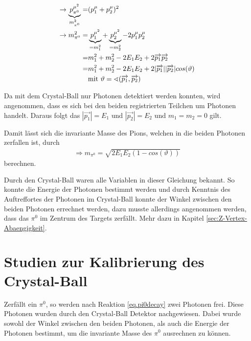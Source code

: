 \documentclass[a4paper,11pt,oneside,final,german,openbib,pdftex]{scrbook}
\begin{document}
{\begin{equation}
\begin{split}
\rightarrow \underbrace{p^{\mu^2}_{\pi^0}}_{m_{\pi^0}^2}=& (p_{1}^{\mu}+p_{2}^{\mu})^2 \\ 
\rightarrow m_{\pi^0}^2=& \underbrace{p_{1}^{\mu^2}}_{=m_1^2}+\underbrace{p_{2}^{\mu^2}}_{=m_2^2}-2p_{1}^{\mu}p_{2}^{\mu} \\ 
=& m_1^2+m_2^2-2E_1E_2+2\overrightarrow{p_1}\overrightarrow{p_2} \\ 
=& m_1^2+m_2^2-2E_1E_2+2|\overrightarrow{p_1}| |\overrightarrow{p_2}| cos(\vartheta) \\
&\textnormal{mit } \vartheta=\sphericalangle(\overrightarrow{p_1},\overrightarrow{p_2})
\end{split}
\end{equation}

Da mit dem Crystal-Ball nur Photonen detektiert werden konnten, wird angenommen, dass es sich bei den beiden  registrierten Teilchen um Photonen handelt. Daraus folgt das $|\overrightarrow{p_1}|=E_1$ und $|\overrightarrow{p_2}|=E_2$ und $m_1=m_2=0$ gilt.

Damit lässt sich die invariante Masse des Pions, welchen in die beiden Photonen zerfallen ist, durch
\begin{equation}
\begin{split}
\Rightarrow{m_{\pi^0}=\sqrt{2E_1E_2(1-cos(\vartheta))}}
\label{eq:Formel-zur-Berechnung-der-Invariante-Masse}
\end{split}
\end{equation}
berechnen.

Durch den Crystal-Ball waren alle Variablen in dieser Gleichung bekannt. So konnte die Energie der Photonen bestimmt werden und durch Kenntnis des Auftreffortes der Photonen im Crystal-Ball konnte der Winkel zwischen den beiden Photonen errechnet werden, dazu musste allerdings angenommen werden, dass das $\pi^0$ im Zentrum des Targets zerfällt. Mehr dazu in Kapitel \ref{sec:Z-Vertex-Abaengigkeit}.

\chapter{Studien zur Kalibrierung des Crystal-Ball}

Zerf\"allt ein $\pi^0$, so werden nach Reaktion \ref{eq.pi0decay} zwei Photonen frei. Diese Photonen wurden durch den Crystal-Ball Detektor nachgewiesen. Dabei wurde sowohl der Winkel zwischen den beiden Photonen, als auch die Energie der Photonen bestimmt, um die invariante Masse des $\pi^0$ ausrechnen zu k\"onnen.

}
\end{document}
